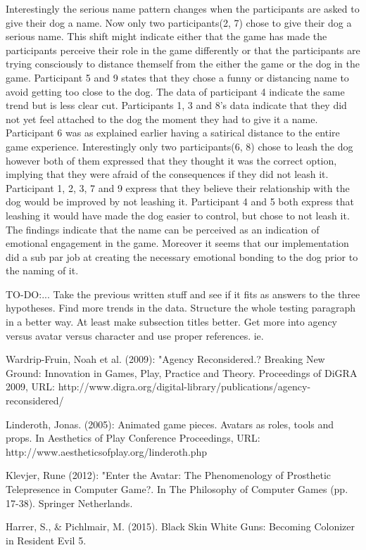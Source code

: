 Interestingly the serious name pattern changes when the participants are asked to give their dog a name. Now only two participants(2, 7) chose to give their dog a serious name. This shift might indicate either that the game has made the participants perceive their role in the game differently or that the participants are trying consciously to distance themself from the either the game or the dog in the game. Participant 5 and 9 states that they chose a funny or distancing name to avoid getting too close to the dog. The data of participant 4 indicate the same trend but is less clear cut. Participants 1, 3 and 8's data indicate that they did not yet feel attached to the dog the moment they had to give it a name. Participant 6 was as explained earlier having a satirical distance to the entire game experience.
Interestingly only two participants(6, 8) chose to leash the dog however both of them expressed that they thought it was the correct option, implying that they were afraid of the consequences if they did not leash it. Participant 1, 2, 3, 7 and 9 express that they believe their relationship with the dog would be improved by not leashing it. Participant 4 and 5 both express that leashing it would have made the dog easier to control, but chose to not leash it. The findings indicate that the name can be perceived as an indication of emotional engagement in the game. Moreover it seems that our implementation did a sub par job at creating the necessary emotional bonding to the dog prior to the naming of it.





TO-DO:...
Take the previous written stuff and see if it fits as answers to the three hypotheses. Find more trends in the data. Structure the whole testing paragraph in a better way. At least make subsection titles better. Get more into agency versus avatar versus character and use proper references.
ie. 

Wardrip-Fruin, Noah et al. (2009): "Agency Reconsidered.? Breaking New Ground: Innovation in Games, Play, Practice and Theory. Proceedings of DiGRA 2009, URL: http://www.digra.org/digital-library/publications/agency-reconsidered/

Linderoth, Jonas. (2005): Animated game pieces. Avatars as roles, tools and props. In Aesthetics of Play Conference Proceedings, URL: http://www.aestheticsofplay.org/linderoth.php

Klevjer, Rune (2012): "Enter the Avatar: The Phenomenology of Prosthetic Telepresence in Computer Game?. In The Philosophy of Computer Games (pp. 17-38). Springer Netherlands.

Harrer, S., & Pichlmair, M. (2015). Black Skin White Guns: Becoming Colonizer in Resident Evil 5.
